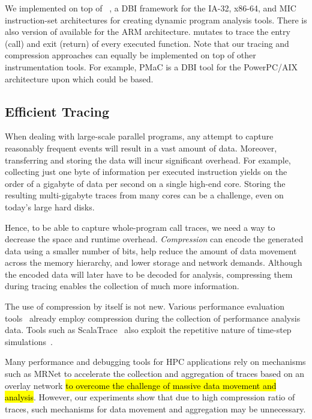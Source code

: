  
%


We implemented \parlot on top of \pin~\cite{pin}, a DBI framework for the IA-32, x86-64, and MIC instruction-set architectures for creating dynamic program analysis tools. There is also version of \pin available for the ARM architecture\cite{pinarm}. \parlot mutates \pin to trace the entry (call) and exit (return) of every executed function. Note that our tracing and compression approaches can equally be implemented on top of other instrumentation tools. For example, PMaC \cite{pmac} is a DBI tool for the PowerPC/AIX architecture upon which \parlot could be based.


\subsection{Efficient Tracing}
When dealing with large-scale parallel programs, any attempt to capture reasonably frequent events will result in a vast amount of data. Moreover, transferring and storing the data will incur significant overhead. For example, collecting just one byte of information per executed instruction yields on the order of a gigabyte of data per second on a single high-end core. Storing the resulting multi-gigabyte traces from many cores can be a challenge, even on today's large hard disks.

Hence, to be able to capture whole-program call traces, we need a way to decrease the space and runtime overhead. \textit{Compression} can encode the generated data using a smaller number of bits, help
reduce the amount of data movement across the memory hierarchy, and
lower storage and network demands.
%
Although the encoded data will later have to be decoded for analysis, compressing them during tracing enables the collection of much more information.

The use of compression by itself is not new.
Various performance evaluation tools~\cite{tau,scorep,eventflowgraph} 
already employ compression during the collection
of performance analysis data.
%
Tools such as ScalaTrace~\cite{scalatrace}
also exploit
the repetitive nature of time-step simulations~\cite{freitag}. %


Many performance and debugging tools for HPC applications \cite{stat,taumrnet} rely on mechanisms such as MRNet\cite{mrnet} to accelerate the collection and aggregation of traces based on an overlay network \hl{to overcome the challenge of massive data movement and analysis}. However, our experiments show that due to high compression ratio of \parlot traces, such mechanisms for data movement and aggregation may be unnecessary.

